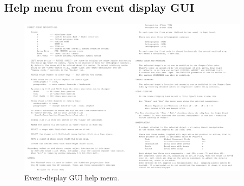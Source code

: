 \documentclass[12pt]{article}
\begin{document}
\pagebreak
\subsection{Help menu from event display GUI}
\label{sec:help_menu}

\begin{figure}[H]
\centering
\includegraphics[width=\textwidth]{figures/viewer_help.jpg}
\caption{Event-display GUI help menu.}
\label{fig:visual_help}
\end{figure}

%
%
\end{document}
